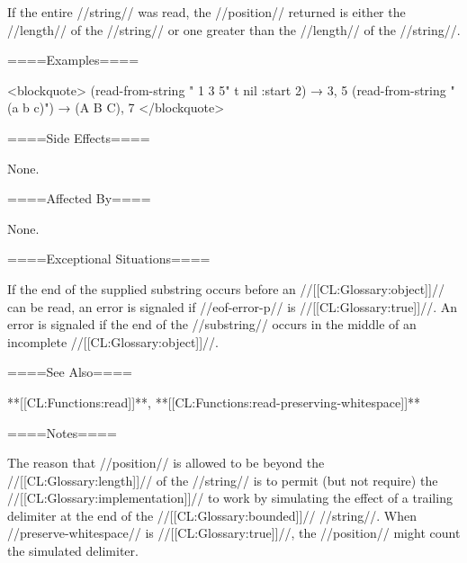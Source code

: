 If the entire //string// was read, the //position// returned is either the //length// of the //string// or one greater than the //length// of the //string//.

====Examples====

<blockquote> (read-from-string " 1 3 5" t nil :start 2) → 3, 5 (read-from-string "(a b c)") → (A B C), 7 </blockquote>

====Side Effects====

None.

====Affected By====

None.

====Exceptional Situations====

If the end of the supplied substring occurs before an //[[CL:Glossary:object]]// can be read, an error is signaled if //eof-error-p// is //[[CL:Glossary:true]]//. An error is signaled if the end of the //substring// occurs in the middle of an incomplete //[[CL:Glossary:object]]//.

====See Also====

**[[CL:Functions:read]]**, **[[CL:Functions:read-preserving-whitespace]]**

====Notes====


The reason that //position// is allowed to be beyond the //[[CL:Glossary:length]]// of the //string// is to permit (but not require) the //[[CL:Glossary:implementation]]// to work by simulating the effect of a trailing delimiter at the end of the //[[CL:Glossary:bounded]]// //string//. When //preserve-whitespace// is //[[CL:Glossary:true]]//, the //position// might count the simulated delimiter.

  

